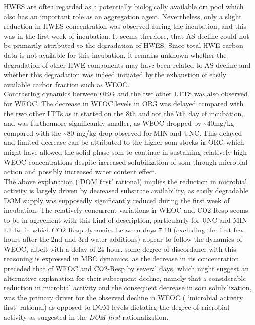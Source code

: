 	HWES are often regarded as a potentially biologically available \gls{om} pool which also has an important role as an aggregation agent. Nevertheless, only a slight reduction in HWES concentration was observed during the incubation, and this was in the first week of incubation. It seems therefore, that AS decline could not be primarily attributed to the degradation of HWES. Since total HWE carbon data is not available for this incubation, it remains unknown whether the degradation of other HWE components may have been related to AS decline and whether this degradation was indeed initiated by  the exhaustion of easily available carbon fraction such as WEOC.\\
	\hypertarget{weoc_decrease}{}
	Contrasting dynamics between ORG and the two other LTTS was also observed for WEOC. The decrease in WEOC levels in ORG was delayed compared with the two other LTTs as it started on the 8th and not the 7th day of incubation, and was furthermore significantly smaller, as WEOC dropped by \~{}40mg/kg compared with the \~{}80 mg/kg drop observed for MIN and UNC. This delayed and limited decrease can be attributed to the higher \gls{som} stocks in ORG which might have allowed the solid phase \gls{som} to continue in sustaining relatively high WEOC concentrations despite increased solubilization of \gls{som} through microbial action and possibly increased water content effect.\\
	The above explanation (‘DOM first’ rational) implies  the reduction in microbial activity is largely driven by decreased substrate availability, as easily degradable DOM supply was supposedly significantly reduced during the first week of incubation. The relatively concurrent variations in WEOC and CO2-Resp seems to be in agreement with this kind of description, particularly for UNC and MIN LTTs, in which CO2-Resp dynamics between days 7-10 (excluding the first few hours after the 2nd and 3rd water additions) appear to follow the dynamics of WEOC, albeit with a delay of 24 hour. some  degree of discordance with this reasoning is expressed in MBC dynamics, as the decrease in its concentration preceded that of WEOC and  CO2-Resp by several days, which might suggest an alternative explanation for their subsequent decline, namely that a considerable reduction in microbial activity and the consequent decrease in \gls{som} solubilization, was the primary driver for the observed decline in WEOC ( ‘microbial activity first’ rational) as opposed to DOM levels dictating the degree of microbial activity as suggested in the \textit{DOM first} rationalization.\\

